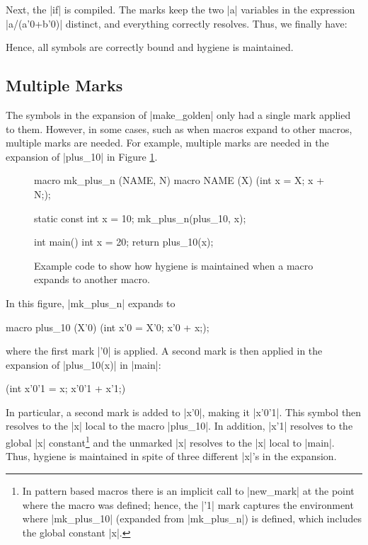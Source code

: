 Next, the |if| is compiled.  The marks keep the two |a| variables in
the expression |a/(a'0+b'0)| distinct, and everything correctly
resolves.  Thus, we finally have:


Hence, all symbols are correctly bound and hygiene is maintained.


\subsection{Multiple Marks}

The symbols in the expansion of |make_golden| only had a single mark
applied to them.  However, in some cases, such as when macros expand
to other macros, multiple marks are needed.
For example, multiple marks are needed in the expansion of |plus_10|
in Figure \ref{macro-macro}.  
\begin{figure}
\begin{codef}
macro mk_plus_n (NAME, N) {
  macro NAME (X) { ({int x = X; x + N;}); }
}

static const int x = 10;
mk_plus_n(plus_10, x);

int main() {
  int x = 20;
  return plus_10(x);
}
\end{codef}
\caption{Example code to show how hygiene is maintained when a macro
  expands to another macro.}
\label{macro-macro}
\end{figure}
In this figure, |mk_plus_n| expands to
\begin{code}
macro plus_10 (X'0) { ({int x'0 = X'0; x'0 + x;}); }
\end{code}
where the first mark |'0| is applied.  A second mark is then applied
in the expansion of |plus_10(x)| in |main|:
\begin{code}
{ ({int x'0'1 = x; x'0'1 + x'1;}) }
\end{code}
In particular, a second mark is added to |x'0|, making it |x'0'1|.
This symbol then resolves to the |x| local to the macro |plus_10|.  In
addition, |x'1| resolves to the global |x| constant\footnote{In pattern
based macros there is an implicit call to |new_mark| at the point
where the macro was defined; hence, the |'1| mark captures the
environment where |mk_plus_10| (expanded from |mk_plus_n|) 
is defined, which includes the global
constant |x|.} and the unmarked |x| resolves to the |x| local to
|main|.  Thus, hygiene is maintained in spite of three different |x|'s
in the expansion.

